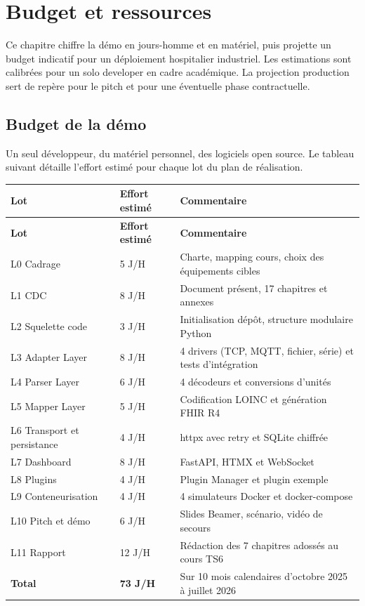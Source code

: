\chapter{Budget et ressources}
\label{ch:budget-ressources}

Ce chapitre chiffre la démo en jours-homme et en matériel, puis projette un budget indicatif pour un déploiement hospitalier industriel. Les estimations sont calibrées pour un solo developer en cadre académique. La projection production sert de repère pour le pitch et pour une éventuelle phase contractuelle.

\section{Budget de la démo}
\label{sec:budget-demo}

Un seul développeur, du matériel personnel, des logiciels open source. Le tableau suivant détaille l'effort estimé pour chaque lot du plan de réalisation.

\bridgezebra
\begin{longtable}{p{3.5cm}p{2.5cm}p{8cm}}
  \toprule
  \rowcolor{bridgeblue!90}
  {\color{white}\bfseries Lot} & {\color{white}\bfseries Effort estimé} & {\color{white}\bfseries Commentaire} \\
  \midrule
  \endfirsthead
  \toprule
  \rowcolor{bridgeblue!90}
  {\color{white}\bfseries Lot} & {\color{white}\bfseries Effort estimé} & {\color{white}\bfseries Commentaire} \\
  \midrule
  \endhead
  \bottomrule
  \endfoot
  L0 Cadrage                  & 5 J/H   & Charte, mapping cours, choix des équipements cibles \\
  L1 CDC                      & 8 J/H   & Document présent, 17 chapitres et annexes \\
  L2 Squelette code           & 3 J/H   & Initialisation dépôt, structure modulaire Python \\
  L3 Adapter Layer            & 8 J/H   & 4 drivers (TCP, MQTT, fichier, série) et tests d'intégration \\
  L4 Parser Layer             & 6 J/H   & 4 décodeurs et conversions d'unités \\
  L5 Mapper Layer             & 5 J/H   & Codification LOINC et génération FHIR R4 \\
  L6 Transport et persistance & 4 J/H   & httpx avec retry et SQLite chiffrée \\
  L7 Dashboard                & 8 J/H   & FastAPI, HTMX et WebSocket \\
  L8 Plugins                  & 4 J/H   & Plugin Manager et plugin exemple \\
  L9 Conteneurisation         & 4 J/H   & 4 simulateurs Docker et docker-compose \\
  L10 Pitch et démo           & 6 J/H   & Slides Beamer, scénario, vidéo de secours \\
  L11 Rapport                 & 12 J/H  & Rédaction des 7 chapitres adossés au cours TS6 \\
  \textbf{Total}              & \textbf{73 J/H} & Sur 10 mois calendaires d'octobre 2025 à juillet 2026 \\
\end{longtable}

